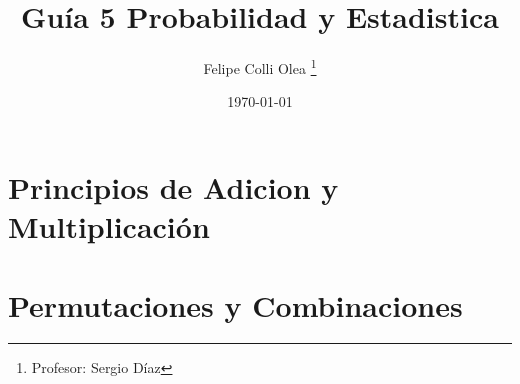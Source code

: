 \documentclass[11pt]{article}
\title{Guía 5 Probabilidad y Estadistica}
\author{Felipe Colli Olea \thanks{Profesor: Sergio Díaz}}
\date{\today}
\begin{document}
\maketitle
\tableofcontents
\newpage

\section{Principios de Adicion y Multiplicación}
\newpage

\section{Permutaciones y Combinaciones}
\end{document}
